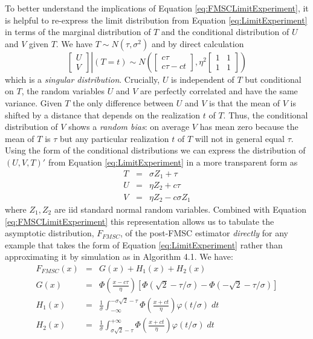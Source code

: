 \documentclass[12pt,letterpaper]{article}
\begin{document}
To better understand the implications of Equation \ref{eq:FMSCLimitExperiment}, it is helpful to re-express the limit distribution from Equation \ref{eq:LimitExperiment} in terms of the marginal distribution of $T$ and the conditional distribution of $U$ and $V$ given $T$. 
We have $T \sim N(\tau, \sigma^2)$ and by direct calculation
\begin{equation}
  \left.\left[
  \begin{array}{c}
   U \\ V 
  \end{array}
\right]\right| (T = t) \sim N\left(
\left[
\begin{array}{c}
  c \tau \\ c\tau - ct
\end{array}
\right], \eta^2
\left[
\begin{array}{cc}
  1 & 1 \\ 1 & 1
\end{array}
\right]
\right)
\label{eq:LimitExperimentConditional}
\end{equation}
which is a \emph{singular distribution}.
Crucially, $U$ is independent of $T$ but conditional on $T$, the random variables $U$ and $V$ are perfectly correlated and have the same variance.
Given $T$ the only difference between $U$ and $V$ is that the mean of $V$ is shifted by a distance that depends on the realization $t$ of $T$.
Thus, the conditional distribution of $V$ shows a \emph{random bias}: on average $V$ has mean zero because the mean of $T$ is $\tau$ but any particular realization $t$ of $T$ will not in general equal $\tau$.
Using the form of the conditional distributions we can express the distribution of $(U,V,T)'$ from Equation \ref{eq:LimitExperiment} in a more transparent form as
\begin{eqnarray*}
  T &=& \sigma Z_1 + \tau\\
  U &=& \eta Z_2 + c\tau\\
  V &=& \eta Z_2 - c\sigma Z_1
\end{eqnarray*}
where $Z_1, Z_2$ are iid standard normal random variables.
Combined with Equation \ref{eq:FMSCLimitExperiment} this representation allows us to tabulate the asymptotic distribution, $F_{FMSC}$, of the post-FMSC estimator \emph{directly} for any example that takes the form of Equation \ref{eq:LimitExperiment} rather than approximating it by simulation as in Algorithm 4.1.
We have:
\begin{eqnarray}
  F_{FMSC}(x) &=& G(x) + H_1(x) + H_2(x) \\
  \label{eq:FFMSC}
  G(x) &=& \Phi\left( \frac{x - c\tau}{\eta} \right)\left[ \Phi( \sqrt{2} - \tau/\sigma) -  \Phi( -\sqrt{2} - \tau/\sigma )\right]\\
  \label{eq:GFMSC}
  H_1(x) &=& \frac{1}{\sigma}\int_{-\infty}^{-\sigma\sqrt{2} - \tau} \Phi\left( \frac{x + ct}{\eta}\right)\varphi(t/\sigma)\; dt\\
  \label{eq:H1FMSC}
  H_2(x) &=& \frac{1}{\sigma}\int^{+\infty}_{\sigma\sqrt{2} - \tau} \Phi\left( \frac{x + ct}{\eta}\right)\varphi(t/\sigma)\; dt
  \label{eq:H2FMSC}
\end{eqnarray}
\end{document}
